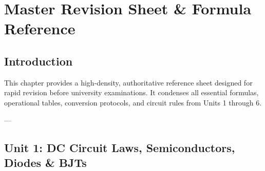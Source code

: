 \chapter{Master Revision Sheet \& Formula Reference}
\label{chap:master-revision-sheet}

\section{Introduction}
This chapter provides a high-density, authoritative reference sheet designed for rapid revision before university examinations. It condenses all essential formulas, operational tables, conversion protocols, and circuit rules from Units 1 through 6.

---

\section{Unit 1: DC Circuit Laws, Semiconductors, Diodes \& BJTs}


